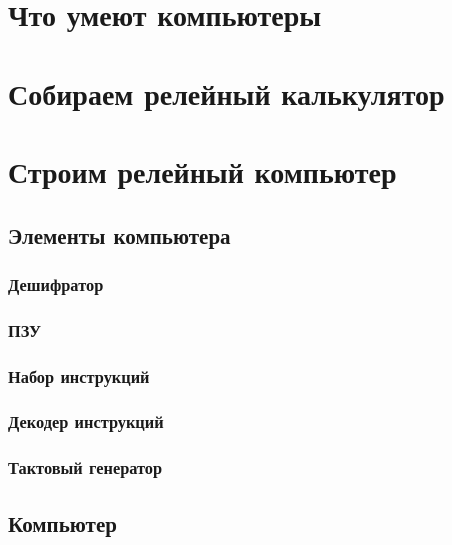 \documentclass[openany]{book}
\begin{document}
\tableofcontents

\part{Что умеют компьютеры}




\part{Собираем релейный калькулятор}







\part{Строим релейный компьютер}

\chapter{Элементы компьютера}

\section{Дешифратор}

\section{ПЗУ}

\section{Набор инструкций}

\section{Декодер инструкций}

\section{Тактовый генератор}


\chapter{Компьютер}
\end{document}
